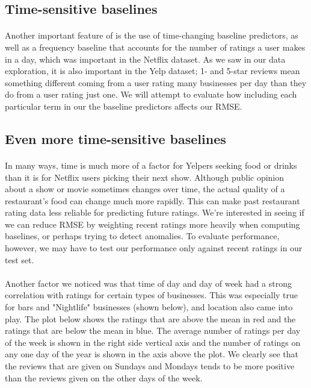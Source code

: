\documentclass[11pt]{article}
\begin{document}
\subsection*{Time-sensitive baselines}

\paragraph{} Another important feature of \cite{koren} is the use of time-changing baseline predictors, as well as a frequency baseline that accounts for the number of ratings a user makes in a day, which was important in the Netflix dataset. As we saw in our data exploration, it is also important in the Yelp dataset; 1- and 5-star reviews mean something different coming from a user rating many businesses per day than they do from a user rating just one. We will attempt to evaluate how including each particular term in our the baseline predictors affects our RMSE.

\subsection*{Even more time-sensitive baselines}

\paragraph{} In many ways, time is much more of a factor for Yelpers seeking food or drinks than it is for Netflix users picking their next show. Although public opinion about a show or movie sometimes changes over time, the actual quality of a restaurant's food can change much more rapidly. This can make past restaurant rating data less reliable for predicting future ratings. We're interested in seeing if we can reduce RMSE by weighting recent ratings more heavily when computing baselines, or perhaps trying to detect anomalies. To evaluate performance, however, we may have to test our performance only against recent ratings in our test set.

\paragraph{} Another factor we noticed was that time of day and day of week had a strong correlation with ratings for certain types of businesses. This was especially true for bars and "Nightlife" businesses (shown below), and location also came into play. The plot below shows the ratings that are above the mean in red and the ratings that are below the mean in blue. The average number of ratings per day of the week is shown in the right side vertical axis and the number of ratings on any one day of the year is shown in the axis above the plot. We clearly see that the reviews that are given on Sundays and Mondays tends to be more positive than the reviews given on the other days of the week.
\end{document}
